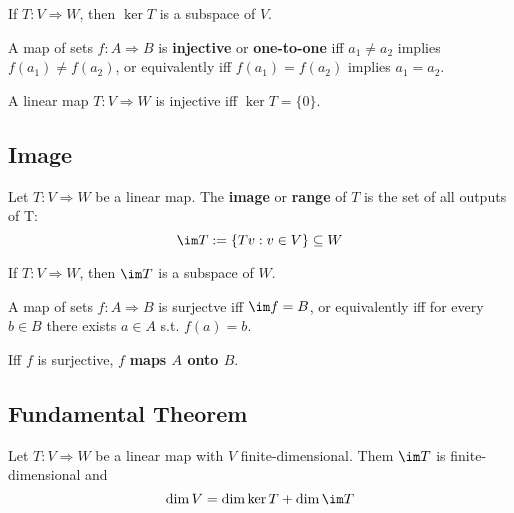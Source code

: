 \begin{theorem} If $T : V \Rightarrow W$, then $\ker T$ is a subspace of $V$.
\end{theorem}

\begin{definition}[Injective]
  A map of sets $f : A \Rightarrow B$ is \textbf{injective} or \textbf{one-to-one} iff $a_1 \neq a_2$ implies $f(a_1) \neq f(a_2)$, or equivalently iff $f(a_1) = f(a_2)$ implies $a_1 = a_2$.
\end{definition}

\begin{theorem}
  A linear map $T : V \Rightarrow W$ is injective iff $\ker T = \{ 0 \}$.
\end{theorem}

\subsection{Image}

\begin{definition}[Image]
  Let $T : V \Rightarrow W$ be a linear map. The \textbf{image} or \textbf{range} of $T$ is the set of all outputs of T:
  \[
    \im T := \{ Tv : v \in V \} \subseteq W
  \]
\end{definition}

\begin{theorem} If $T : V \Rightarrow W$, then $\im T$ is a subspace of $W$.
\end{theorem}

\begin{definition}[Surjective]
  A map of sets $f : A \Rightarrow B$ is surjectve iff $\im f = B$, or equivalently iff for every $b \in B$ there exists $a \in A$ s.t. $f(a) = b$.

  Iff $f$ is surjective, $f$ \textbf{maps $A$ onto $B$}.
\end{definition}

\subsection{Fundamental Theorem}

\begin{namedtheorem}
  Let $T : V \Rightarrow W$ be a linear map with $V$ finite-dimensional. Them $\im T$ is finite-dimensional and
  \[
    \dim V = \dim \ker T + \dim \im T
  \]
\end{namedtheorem}

